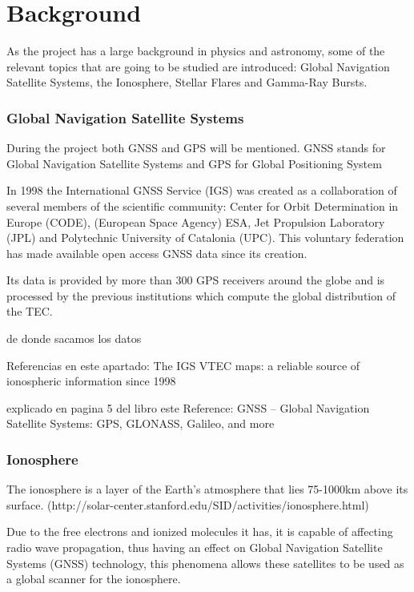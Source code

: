 \chapter{Background}

As the project has a large background in physics and astronomy, some of the relevant topics that are going to be studied are introduced: Global Navigation Satellite Systems, the Ionosphere, Stellar Flares and Gamma-Ray Bursts.

\subsection{Global Navigation Satellite Systems}

During the project both GNSS and GPS will be mentioned. GNSS stands for Global Navigation Satellite Systems and GPS for Global Positioning System 

In 1998 the International GNSS Service (IGS) was created as a collaboration of several members of the scientific community: Center for Orbit Determination in Europe (CODE), (European Space Agency) ESA, Jet Propulsion Laboratory (JPL) and Polytechnic University of Catalonia (UPC). This voluntary federation has made available open access GNSS data since its creation. 

Its data is provided by more than 300 GPS receivers around the globe and is processed by the previous institutions which compute the global distribution of the TEC.

de donde sacamos los datos

Referencias en este apartado: {The IGS VTEC maps: a reliable source of ionospheric information since 1998}

explicado en pagina 5 del libro este Reference: GNSS – Global Navigation Satellite Systems: GPS, GLONASS, Galileo, and more

\subsection{Ionosphere}

The ionosphere is a layer of the Earth’s atmosphere that lies 75-1000km above its surface. (http://solar-center.stanford.edu/SID/activities/ionosphere.html) 

Due to the free electrons and ionized molecules it has, it is capable of affecting radio wave propagation, thus having an effect on Global Navigation Satellite Systems (GNSS) technology, this phenomena allows these satellites to be used as a global scanner for the ionosphere. 

